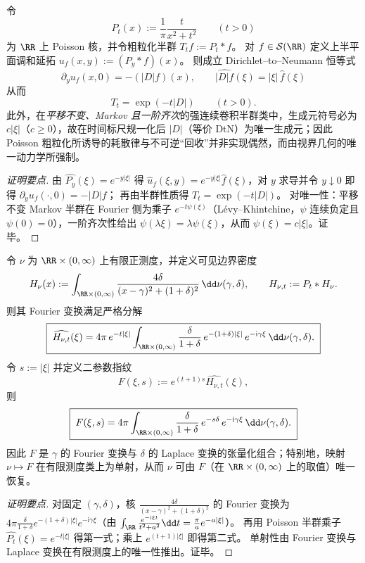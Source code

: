 \begin{proposition}\label{con:discussion-dtn-generator}
令
\[
P_t(x):=\frac{1}{\pi}\frac{t}{x^2+t^2}\qquad(t>0)
\]
为 \(\RR\) 上 Poisson 核，并令粗粒化半群 \(T_t f:=P_t*f\)。
对 \(f\in\mathcal{S}(\RR)\) 定义上半平面调和延拓
\(
u_f(x,y):=(P_y*f)(x)
\)。
则成立 Dirichlet--to--Neumann 恒等式
\[
\boxed{\;
\partial_y u_f(x,0)=-(|D|f)(x),\qquad \widehat{|D|f}(\xi)=|\xi|\,\widehat f(\xi)\;}
\]
从而
\[
\boxed{\;T_t=\exp(-t|D|)\qquad(t>0).\;}
\]
此外，在\emph{平移不变、Markov 且一阶齐次}的强连续卷积半群类中，生成元符号必为 \(c|\xi|\)（\(c\ge 0\)），故在时间标尺规一化后 \( |D| \)（等价 DtN）为唯一生成元；因此 Poisson 粗粒化所诱导的耗散律与不可逆“回收”并非实现偶然，而由视界几何的唯一动力学所强制。
\end{proposition}
\begin{proof}[证明要点]
由 \(\widehat{P_y}(\xi)=e^{-y|\xi|}\) 得 \(\widehat u_f(\xi,y)=e^{-y|\xi|}\widehat f(\xi)\)，对 \(y\) 求导并令 \(y\downarrow 0\) 即得 \(\partial_y u_f(\cdot,0)=-|D|f\)；
再由半群性质得 \(T_t=\exp(-t|D|)\)。
对唯一性：平移不变 Markov 半群在 Fourier 侧为乘子 \(e^{-t\psi(\xi)}\)（L\'evy--Khintchine，\(\psi\) 连续负定且 \(\psi(0)=0\)），一阶齐次性给出 \(\psi(\lambda\xi)=\lambda\psi(\xi)\)，从而 \(\psi(\xi)=c|\xi|\)。证毕。
\end{proof}

\begin{proposition}\label{con:discussion-defect-measure-fourier-laplace}
令 \(\nu\) 为 \(\RR\times(0,\infty)\) 上有限正测度，并定义可见边界密度
\[
H_\nu(x):=\int_{\RR\times(0,\infty)}\frac{4\delta}{(x-\gamma)^2+(1+\delta)^2}\,\dd\nu(\gamma,\delta),
\qquad
H_{\nu,t}:=P_t*H_\nu.
\]
则其 Fourier 变换满足严格分解
\[
\boxed{\;
\widehat{H_{\nu,t}}(\xi)
=4\pi\,e^{-t|\xi|}
\int_{\RR\times(0,\infty)}
\frac{\delta}{1+\delta}\,
e^{-(1+\delta)|\xi|}\,e^{-\mathrm{i}\gamma\xi}\,\dd\nu(\gamma,\delta).\;}
\]
令 \(s:=|\xi|\) 并定义二参数指纹
\[
F(\xi,s):=e^{(t+1)s}\widehat{H_{\nu,t}}(\xi),
\]
则
\[
\boxed{\;
F(\xi,s)
=4\pi\int_{\RR\times(0,\infty)}\frac{\delta}{1+\delta}\,e^{-s\delta}\,e^{-\mathrm{i}\gamma\xi}\,\dd\nu(\gamma,\delta).\;}
\]
因此 \(F\) 是 \(\gamma\) 的 Fourier 变换与 \(\delta\) 的 Laplace 变换的张量化组合；特别地，映射 \(\nu\mapsto F\) 在有限测度类上为单射，从而 \(\nu\) 可由 \(F\)（在 \(\RR\times(0,\infty)\) 上的取值）唯一恢复。
\end{proposition}
\begin{proof}[证明要点]
对固定 \((\gamma,\delta)\)，核 \(\frac{4\delta}{(x-\gamma)^2+(1+\delta)^2}\) 的 Fourier 变换为 \(4\pi\frac{\delta}{1+\delta}e^{-(1+\delta)|\xi|}e^{-\mathrm{i}\gamma\xi}\)（由 \(\int_{\RR}\frac{e^{-\mathrm{i}\xi t}}{t^2+a^2}\dd t=\frac{\pi}{a}e^{-a|\xi|}\)）。
再用 Poisson 半群乘子 \(\widehat{P_t}(\xi)=e^{-t|\xi|}\) 得第一式；乘上 \(e^{(t+1)|\xi|}\) 即得第二式。
单射性由 Fourier 变换与 Laplace 变换在有限测度上的唯一性推出。证毕。
\end{proof}

